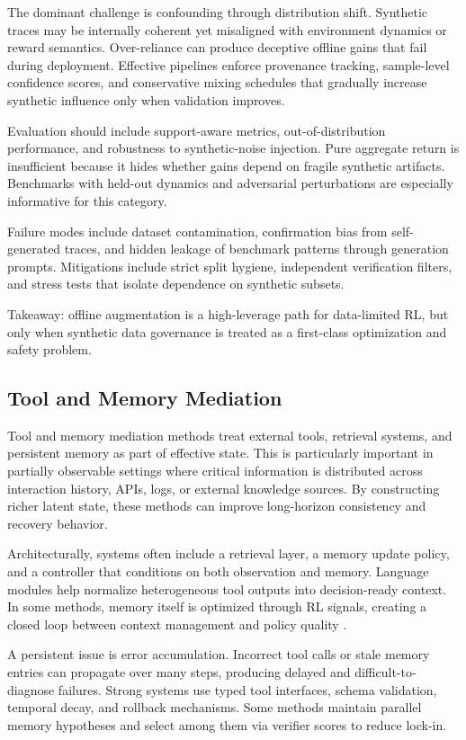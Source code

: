 \documentclass[pdflatex,sn-mathphys-num]{sn-jnl}
\begin{document}
The dominant challenge is confounding through distribution shift. Synthetic traces may be internally coherent yet misaligned with environment dynamics or reward semantics. Over-reliance can produce deceptive offline gains that fail during deployment. Effective pipelines enforce provenance tracking, sample-level confidence scores, and conservative mixing schedules that gradually increase synthetic influence only when validation improves.

Evaluation should include support-aware metrics, out-of-distribution performance, and robustness to synthetic-noise injection. Pure aggregate return is insufficient because it hides whether gains depend on fragile synthetic artifacts. Benchmarks with held-out dynamics and adversarial perturbations are especially informative for this category.

Failure modes include dataset contamination, confirmation bias from self-generated traces, and hidden leakage of benchmark patterns through generation prompts. Mitigations include strict split hygiene, independent verification filters, and stress tests that isolate dependence on synthetic subsets.

Takeaway: offline augmentation is a high-leverage path for data-limited RL, but only when synthetic data governance is treated as a first-class optimization and safety problem.

\subsection{Tool and Memory Mediation}
Tool and memory mediation methods treat external tools, retrieval systems, and persistent memory as part of effective state. This is particularly important in partially observable settings where critical information is distributed across interaction history, APIs, logs, or external knowledge sources. By constructing richer latent state, these methods can improve long-horizon consistency and recovery behavior.

Architecturally, systems often include a retrieval layer, a memory update policy, and a controller that conditions on both observation and memory. Language modules help normalize heterogeneous tool outputs into decision-ready context. In some methods, memory itself is optimized through RL signals, creating a closed loop between context management and policy quality \cite{arxiv_p_2404_03648,arxiv_p_2511_14460,arxiv_p_2602_00994,arxiv_p_2601_07264}.

A persistent issue is error accumulation. Incorrect tool calls or stale memory entries can propagate over many steps, producing delayed and difficult-to-diagnose failures. Strong systems use typed tool interfaces, schema validation, temporal decay, and rollback mechanisms. Some methods maintain parallel memory hypotheses and select among them via verifier scores to reduce lock-in.
\end{document}
